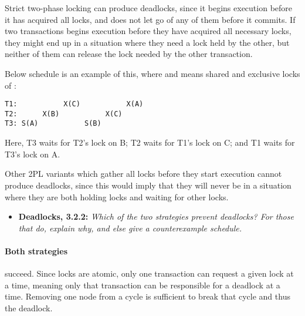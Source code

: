 Strict two-phase locking can produce deadlocks, since it begins execution before
it has acquired all locks, and does not let go of any of them before it commits.
If two transactions begins execution before they have acquired all necessary
locks, they might end up in a situation where they need a lock held by the
other, but neither of them can release the lock needed by the other transaction.
\smallskip

Below schedule is an example of this, where  and  means shared
and exclusive locks of :

\begin{verbatim}
T1:           X(C)           X(A)
T2:      X(B)           X(C)
T3: S(A)           S(B)
\end{verbatim}

Here, T3 waits for T2's lock on B; T2 waits for T1's lock on C; and T1 waits for
T3's lock on A.
\medskip

Other 2PL variants which gather all locks before they start execution cannot
produce deadlocks, since this would imply that they will never be in a situation
where they are both holding locks and waiting for other locks.


\begin{itemize}
  \item \textbf{Deadlocks, 3.2.2:}
    \textit{Which of the two strategies prevent deadlocks? For those that do,
    explain why, and else give a counterexample schedule.}
\end{itemize}

\paragraph{Both strategies} succeed. Since locks are atomic, only one
transaction can request a given lock at a time, meaning only that transaction
can be responsible for a deadlock at a time. Removing one node from a cycle is
sufficient to break that cycle and thus the deadlock.

\Sectend
